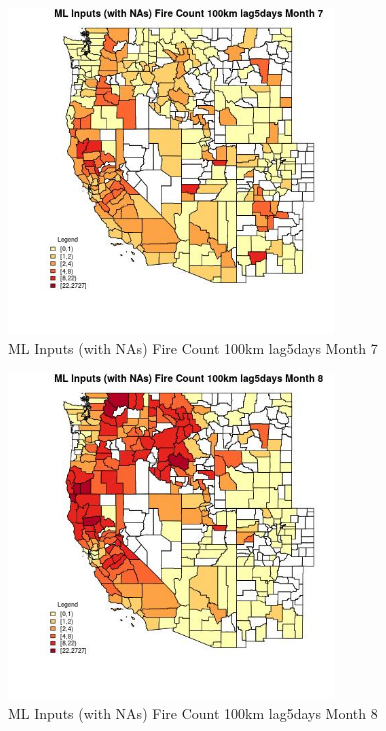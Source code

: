 \clearpage 

\begin{figure} 
\centering  
\includegraphics[width=0.77\textwidth]{Code_Outputs/Report_ML_input_PM25_Step4_part_f_de_duplicated_aveswNAs_CountyFire_Count_100km_lag5daysmedianMonth7.jpg} 
\caption{\label{fig:Report_ML_input_PM25_Step4_part_f_de_duplicated_aveswNAsCountyFire_Count_100km_lag5daysmedianMonth7}ML Inputs (with NAs) Fire Count 100km lag5days Month 7} 
\end{figure} 
 

\begin{figure} 
\centering  
\includegraphics[width=0.77\textwidth]{Code_Outputs/Report_ML_input_PM25_Step4_part_f_de_duplicated_aveswNAs_CountyFire_Count_100km_lag5daysmedianMonth8.jpg} 
\caption{\label{fig:Report_ML_input_PM25_Step4_part_f_de_duplicated_aveswNAsCountyFire_Count_100km_lag5daysmedianMonth8}ML Inputs (with NAs) Fire Count 100km lag5days Month 8} 
\end{figure} 
 

